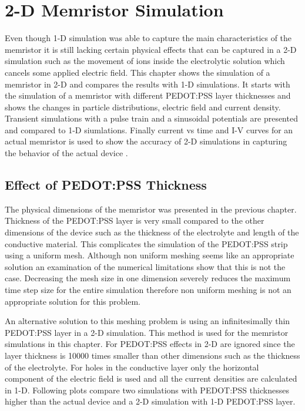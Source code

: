 
\chapter{2-D Memristor Simulation} %

\label{Chapter6} %


Even though 1-D simulation was able to capture the main characteristics of the memristor it is still lacking certain physical effects that can be captured in a 2-D simulation such as the movement of ions inside the electrolytic solution which cancels some applied electric field. This chapter shows the simulation of a memristor in 2-D and compares the results with 1-D simulations. It starts with the simulation of a memristor with different PEDOT:PSS layer thicknesses and shows the changes in particle distributions, electric field and current density. 
Transient simulations with a pulse train and a sinusoidal potentials are presented and compared to 1-D siumlations. Finally current vs time and I-V curves for an actual memristor is used to show the accuracy of 2-D simulations in capturing the behavior of the actual device .  

\section{Effect of PEDOT:PSS Thickness}

The physical dimensions of the memristor was presented in the previous chapter. Thickness of the PEDOT:PSS layer is very small compared to the other dimensions of the device such as the thickness of the electrolyte and length of the conductive material. This complicates the simulation of the PEDOT:PSS strip using a uniform mesh. Although non uniform meshing seems like an appropriate solution an examination of the numerical limitations show that this is not the case. Decreasing the mesh size in one dimension severely reduces the maximum time step size for the entire simulation therefore non uniform meshing is not an appropriate solution for this problem. 

An alternative solution to this meshing problem is using an infinitesimally thin PEDOT:PSS layer in a 2-D simulation. This method is used for the memristor simulations in this chapter. For PEDOT:PSS effects in 2-D are ignored since the layer thickness is 10000 times smaller than other dimensions such as the thickness of the electrolyte. For holes in the conductive layer only the horizontal component of the electric field is used and all the current densities are calculated in 1-D. Following plots compare two simulations with PEDOT:PSS thicknesses higher than the actual device and a 2-D simulation with 1-D PEDOT:PSS layer.  

